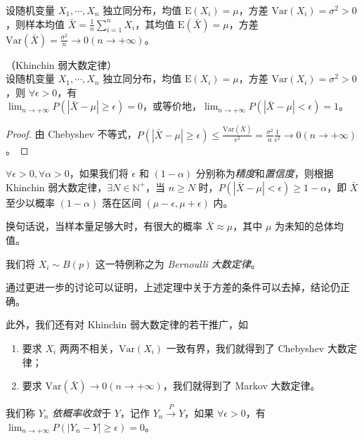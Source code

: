\documentclass[../main.tex]{subfiles}
\begin{document}
设随机变量 $X_1,\cdots,X_n$ 独立同分布，均值 $\mathrm E(X_i)=\mu$，方差 $\mathrm{Var}(X_i)=\sigma^2>0$，则样本均值 $\bar X=\frac1n\sum_{i=1}^nX_i$，其均值 $\mathrm E(\bar X)=\mu$，方差 $\mathrm{Var}(\bar X)=\frac{\sigma^2}n\rightarrow0(n\rightarrow+\infty)$。


\begin{theorem}\label{thm:5.2.1}
    （Khinchin 弱大数定律）\\
    设随机变量 $X_1,\cdots,X_n$ 独立同分布，均值 $\mathrm E(X_i)=\mu$，方差 $\mathrm{Var}(X_i)=\sigma^2>0$，则 $\forall\epsilon>0$，有\\
    $\lim_{n\rightarrow+\infty}P(|\bar X-\mu|\geq\epsilon)=0$，或等价地，$\lim_{n\rightarrow+\infty}P(|\bar X-\mu|<\epsilon)=1$。
\end{theorem}

\begin{proof}
    由 Chebyshev 不等式，$P(|\bar X-\mu|\geq\epsilon)\leq\frac{\mathrm{Var}(\bar X)}{\epsilon^2}=\frac{\sigma^2}n\frac1{\epsilon^2}\rightarrow0(n\rightarrow+\infty)$。
\end{proof}

$\forall\epsilon>0,\forall\alpha>0$，如果我们将 $\epsilon$ 和 $(1-\alpha)$ 分别称为\emph{精度}和\emph{置信度}，则根据 Khinchin 弱大数定律，$\exists N\in\mathbb N^+$，当 $n\geq N$ 时，$P(|\bar X-\mu|<\epsilon)\geq1-\alpha$，即 $\bar X$ 至少以概率 $(1-\alpha)$ 落在区间 $(\mu-\epsilon,\mu+\epsilon)$ 内。

换句话说，当样本量足够大时，有很大的概率 $\bar X\approx\mu$，其中 $\mu$ 为未知的总体均值。

我们将 $X_i\sim B(p)$ 这一特例称之为 \emph{Bernoulli 大数定律}。

通过更进一步的讨论可以证明，上述定理中关于方差的条件可以去掉，结论仍正确。

此外，我们还有对 Khinchin 弱大数定律的若干推广，如
\begin{enumerate}
    \item 要求 $X_i$ 两两不相关，$\mathrm{Var}(X_i)$ 一致有界，我们就得到了 Chebyshev 大数定律；
    \item 要求 $\mathrm{Var}(\bar X)\rightarrow0(n\rightarrow+\infty)$，我们就得到了 Markov 大数定律。
\end{enumerate}

\begin{definition}\label{def:5.2.1}
    我们称 $Y_n$ \emph{依概率收敛}于 $Y$，记作 $Y_n\overset{P}{\rightarrow}Y$，如果 $\forall\epsilon>0$，有 $\lim_{n\rightarrow+\infty}P(|Y_n-Y|\geq\epsilon)=0$。
\end{definition}
\end{document}
